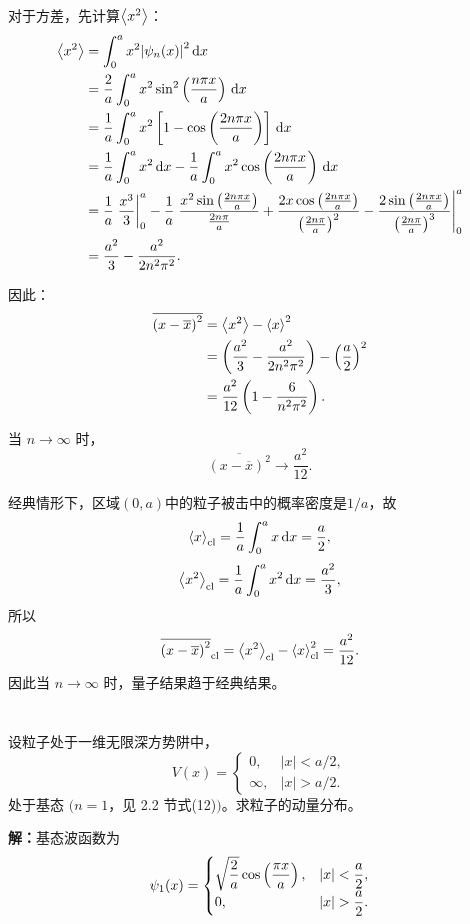 \documentclass[10pt,a4paper]{article}
\begin{document}
对于方差，先计算$\ev{x^2}$：
\begin{align*}
\ev{x^2}
&=\int_0^a x^2\abs{\psi_n(x)}^2\,\dd x \\
&=\frac{2}{a}\int_0^a x^2\sin^2\left(\frac{n\pi x}{a}\right)\,\dd x \\
&=\frac{1}{a}\int_0^a x^2\left[1-\cos\left(\frac{2n\pi x}{a}\right)\right]\,\dd x \\
&=\frac{1}{a}\int_0^a x^2\,\dd x-\frac{1}{a}\int_0^a x^2\cos\left(\frac{2n\pi x}{a}\right)\,\dd x \\
&=\frac{1}{a}\eval{\frac{x^3}{3}}_0^a
-\frac{1}{a}\eval{\frac{x^2\sin\left(\frac{2n\pi x}{a}\right)}{\frac{2n\pi}{a}}
+\frac{2x\cos\left(\frac{2n\pi x}{a}\right)}{\left(\frac{2n\pi}{a}\right)^2}
-\frac{2\sin\left(\frac{2n\pi x}{a}\right)}{\left(\frac{2n\pi}{a}\right)^3}}_0^a \\
&=\frac{a^2}{3}-\frac{a^2}{2n^2\pi^2}.
\end{align*}

因此：
\begin{align*}
\overline{\left(x-\overline{x}\right)^2}
&=\ev{x^2}-\ev{x}^2 \\
&=\left(\frac{a^2}{3}-\frac{a^2}{2n^2\pi^2}\right)-\left(\frac{a}{2}\right)^2 \\
&=\frac{a^2}{12}\left(1-\frac{6}{n^2\pi^2}\right).
\end{align*}

当 $n\to\infty$ 时，
\[
\overline{\left(x-\overline{x}\right)^2}\to\frac{a^2}{12}.
\]

经典情形下，区域$(0,a)$中的粒子被击中的概率密度是$1/a$，故
\[
\ev{x}_{\mathrm{cl}}
=\frac{1}{a}\int_0^a x\,\dd x
=\frac{a}{2},
\]
\[
\ev{x^2}_{\mathrm{cl}}
=\frac{1}{a}\int_0^a x^2\,\dd x
=\frac{a^2}{3},
\]
所以
\[
\overline{\left(x-\overline{x}\right)^2}_{\mathrm{cl}}
=\ev{x^2}_{\mathrm{cl}}-\ev{x}_{\mathrm{cl}}^2
=\frac{a^2}{12}.
\]
因此当 $n\to\infty$ 时，量子结果趋于经典结果。

\section{}
设粒子处于一维无限深方势阱中，
\[
V(x)=
\begin{cases}
0, & |x|<a/2,\\
\infty, & |x|>a/2.
\end{cases}
\]
处于基态 $(n=1$，见 2.2 节式(12)$)$。求粒子的动量分布。

\vspace{0.5cm}

\noindent\textbf{解：}基态波函数为
\[
\psi_1(x)=
\begin{cases}
\sqrt{\dfrac{2}{a}}\cos\left(\dfrac{\pi x}{a}\right), & \abs{x}<\dfrac{a}{2},\\
0, & \abs{x}>\dfrac{a}{2}.
\end{cases}
\]
\end{document}
